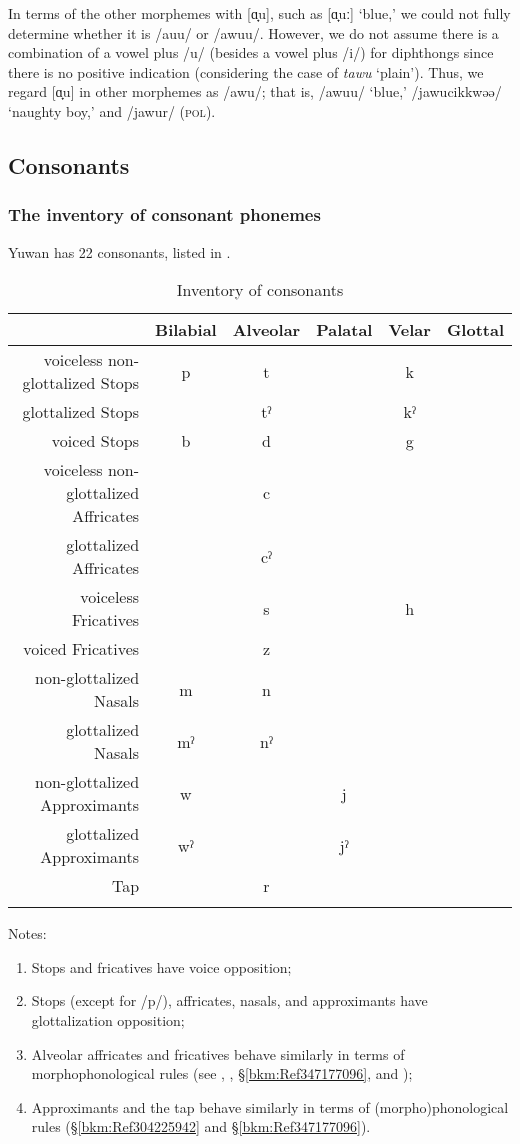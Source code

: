 In terms of the other morphemes with [ɑ̟u], such as [ɑ̟uː] ‘blue,’ we could not fully determine whether it is /auu/ or /awuu/. However, we do not assume there is a combination of a vowel plus /u/ (besides a vowel plus /i/) for diphthongs since there is no positive indication (considering the case of \textit{tawu} ‘plain’). Thus, we regard [ɑ̟u] in other morphemes as /awu/; that is, /awuu/ ‘blue,’ /jawucikkwəə/ ‘naughty boy,’ and /jawur/ (\textsc{pol}).

\subsection{Consonants}
\subsubsection{The inventory of consonant phonemes}

Yuwan has 22 consonants, listed in .

\begin{table}
\caption{Inventory of consonants\label{tab:2:8}}
\begin{tabular}{rccccc}
\lsptoprule
     & Bilabial &  Alveolar &  Palatal &  Velar & Glottal\\\midrule
voiceless non-glottalized Stops & p & t  & &  k  \\
glottalized Stops  &  & tˀ & &   kˀ  \\
voiced  Stops  &  b  & d  & &  g  \\
voiceless non-glottalized Affricates &   & c      \\
glottalized Affricates  &  & cˀ      \\
voiceless Fricatives   &   & s  & &     h\\
voiced Fricatives  &   & z      \\
non-glottalized Nasals & m & n      \\
{glottalized Nasals} & mˀ & nˀ      \\
{non-glottalized Approximants} & w  & &  j    \\
{glottalized Approximants} & wˀ & &   jˀ    \\
Tap   & & r      \\
\lspbottomrule
\end{tabular}
\end{table}

Notes:
\begin{enumerate}[label=\alph*.]
\item Stops and fricatives have voice opposition;
\item Stops (except for /p/), affricates, nasals, and approximants have glottalization opposition;
\item Alveolar affricates and fricatives behave similarly in terms of morphophonological rules (see , , §\ref{bkm:Ref347177096}, and );
\item Approximants and the tap behave similarly in terms of (morpho)phonological rules (§\ref{bkm:Ref304225942} and §\ref{bkm:Ref347177096}).
\end{enumerate}


